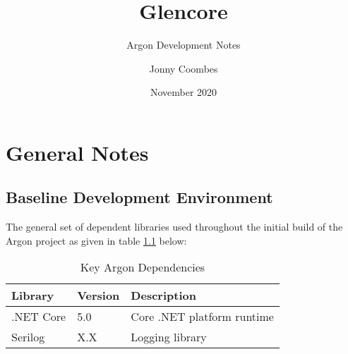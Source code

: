\documentclass{book}
\title{Glencore}
\subtitle{Argon Development Notes}
\author{Jonny Coombes}
\date{November 2020}
\begin{document}
\maketitle
{}
\newpage
\tableofcontents
\newpage
{}

\chapter{General Notes}

\section{Baseline Development Environment}
The general set of dependent libraries used throughout the initial build of the Argon project as given in table \ref*{table:1} below:\\
\begin{table}[h!]
    \centering
    \begin{tabular}{||l | l | l ||}
        \hline
        Library & Version & Description \\
        \hline
        .NET Core & 5.0 & Core .NET platform runtime\\
        Serilog & X.X & Logging library\\
        \hline 
    \end{tabular}
    \caption{Key Argon Dependencies}
    \label{table:1}
\end{table}
\end{document}

